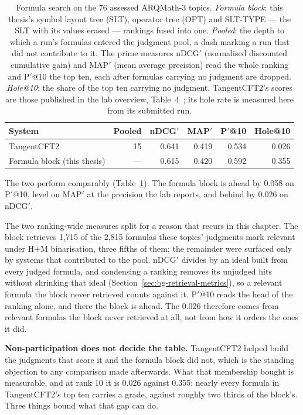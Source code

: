 \begin{table}[t]
\centering
\small
\renewcommand{\arraystretch}{1.2}
\begin{tabular}{lrrrrr}
\toprule
System & Pooled & nDCG$'$ & MAP$'$ & P$'$@10 & Hole@10 \\
\midrule
TangentCFT2                 & 15  & 0.641 & 0.419 & 0.534 & 0.026 \\
Formula block (this thesis) & --- & 0.615 & 0.420 & 0.592 & 0.355 \\
\bottomrule
\end{tabular}
\caption[Formula search against a published system]{Formula search on the 76 assessed ARQMath-3 topics.
\emph{Formula block}: this thesis's symbol layout tree (SLT), operator tree (OPT) and SLT-TYPE ---
the SLT with its values erased --- rankings fused into one. \emph{Pooled}: the depth to which a
run's formulas entered the judgment pool, a dash marking a run that did not contribute to it. The
prime measures nDCG$'$ (normalised discounted cumulative gain) and MAP$'$ (mean average precision)
read the whole ranking and P$'$@10 the top ten, each after formulas carrying no judgment are
dropped. \emph{Hole@10}: the share of the top ten carrying no judgment. TangentCFT2's scores are
those published in the lab overview, Table~4~\cite{mansouri2022arqmath3}; its hole rate is measured
here from its submitted run.}
\label{tab:guard-task2-placement}
\end{table}

The two perform comparably (Table~\ref{tab:guard-task2-placement}). The formula block is ahead
by 0.058 on P$'$@10, level on MAP$'$ at the precision the lab reports, and behind by 0.026 on
nDCG$'$.

The two ranking-wide measures split for a reason that recurs in this chapter. The block
retrieves 1{,}715 of the 2{,}815 formulas these topics' judgments mark relevant under H+M
binarisation, three fifths of them; the remainder were surfaced only by systems that
contributed to the pool. nDCG$'$ divides by an ideal built from every judged formula, and
condensing a ranking removes its unjudged hits without shrinking that ideal
(Section~\ref{sec:bg-retrieval-metrics}), so a relevant formula the block never retrieved
counts against it. P$'$@10 reads the head of the ranking alone, and there the block is ahead.
The 0.026 therefore comes from relevant formulas the block never retrieved at all, not from
how it orders the ones it did.

\textbf{Non-participation does not decide the table.} TangentCFT2 helped build the judgments
that score it and the formula block did not, which is the standing objection to any comparison
made afterwards. What that membership bought is measurable, and at rank 10 it is 0.026 against
0.355: nearly every formula in TangentCFT2's top ten carries a grade, against roughly two
thirds of the block's. Three things bound what that gap can do.

